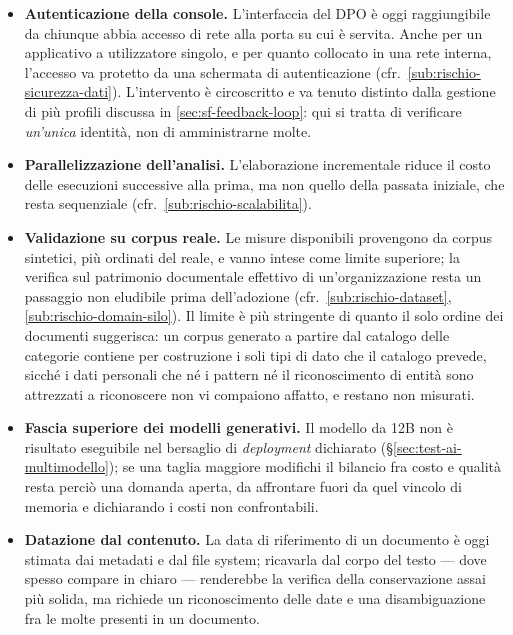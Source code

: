 \begin{itemize}
	\item \textbf{Autenticazione della console.} L'interfaccia del DPO è oggi raggiungibile da chiunque abbia accesso di rete alla porta su cui è servita. Anche per un applicativo a utilizzatore singolo, e per quanto collocato in una rete interna, l'accesso va protetto da una schermata di autenticazione (cfr.~\ref{sub:rischio-sicurezza-dati}). L'intervento è circoscritto e va tenuto distinto dalla gestione di più profili discussa in \ref{sec:sf-feedback-loop}: qui si tratta di verificare \emph{un'unica} identità, non di amministrarne molte.
	\item \textbf{Parallelizzazione dell'analisi.} L'elaborazione incrementale riduce il costo delle esecuzioni successive alla prima, ma non quello della passata iniziale, che resta sequenziale (cfr.~\ref{sub:rischio-scalabilita}).
	\item \textbf{Validazione su corpus reale.} Le misure disponibili provengono da corpus sintetici, più ordinati del reale, e vanno intese come limite superiore; la verifica sul patrimonio documentale effettivo di un'organizzazione resta un passaggio non eludibile prima dell'adozione (cfr.~\ref{sub:rischio-dataset}, \ref{sub:rischio-domain-silo}). Il limite è più stringente di quanto il solo ordine dei documenti suggerisca: un corpus generato a partire dal catalogo delle categorie contiene per costruzione i soli tipi di dato che il catalogo prevede, sicché i dati personali che né i pattern né il riconoscimento di entità sono attrezzati a riconoscere non vi compaiono affatto, e restano non misurati.
	\item \textbf{Fascia superiore dei modelli generativi.} Il modello da 12B non è risultato eseguibile nel bersaglio di \textit{deployment} dichiarato (§\ref{sec:test-ai-multimodello}); se una taglia maggiore modifichi il bilancio fra costo e qualità resta perciò una domanda aperta, da affrontare fuori da quel vincolo di memoria e dichiarando i costi non confrontabili.
	\item \textbf{Datazione dal contenuto.} La data di riferimento di un documento è oggi stimata dai metadati e dal file system; ricavarla dal corpo del testo --- dove spesso compare in chiaro --- renderebbe la verifica della conservazione assai più solida, ma richiede un riconoscimento delle date e una disambiguazione fra le molte presenti in un documento.
\end{itemize}
